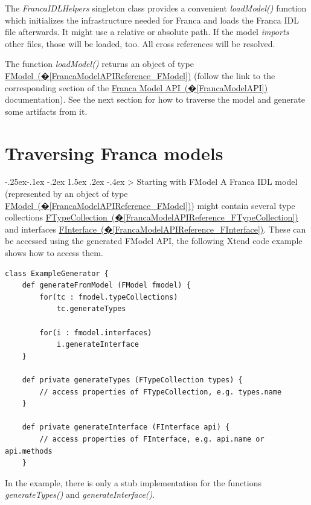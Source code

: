 \documentclass[a4paper,10pt]{scrreprt}
\makeatletter
\renewcommand\subsection{\medskip\@startsection{subsection}{2}{\z@}%
  {-.25ex\@plus -.1ex \@minus -.2ex}%
  {1.5ex \@plus .2ex \@minus -.4ex}%
  {\ifnum \scr@compatibility>\@nameuse{scr@v@2.96}\relax
    \setlength{\parfillskip}{\z@ plus 1fil}\fi
    \raggedsection\normalfont\sectfont\nobreak\size@subsection
  }%
}
\makeatother
\begin{document}
The \textit{FrancaIDLHelpers} singleton class provides a convenient \textit{loadModel()} 
function which initializes the infrastructure needed for Franca and
loads the Franca IDL file afterwards. It might use a relative or absolute
path. If the model \textit{imports} other files, those will be loaded, too.
All cross references will be resolved. 

The function \textit{loadModel()} returns an object of type
\hyperref[FrancaModelAPIReference_FModel]{FModel~(�\ref*{FrancaModelAPIReference_FModel})} (follow the link to the 
corresponding section of the \hyperref[FrancaModelAPI]{Franca Model API~(�\ref*{FrancaModelAPI})} documentation).
See the next section for how to traverse the model and generate some artifacts from it.

\section{Traversing Franca models}
\label{BuildingGenerators_TraversingFrancaModels}
\subsection{Starting with FModel}
\label{BuildingGenerators_TraversingFrancaModels_Top}
A Franca IDL model (represented by an object of type \hyperref[FrancaModelAPIReference_FModel]{FModel~(�\ref*{FrancaModelAPIReference_FModel})}) 
might contain several type collections \hyperref[FrancaModelAPIReference_FTypeCollection]{FTypeCollection~(�\ref*{FrancaModelAPIReference_FTypeCollection})}
and interfaces \hyperref[FrancaModelAPIReference_FInterface]{FInterface~(�\ref*{FrancaModelAPIReference_FInterface})}. These can be accessed using
the generated FModel API, the following Xtend code example shows how to access them.
 

\begin{lstlisting}[language=Xtend]
class ExampleGenerator {
	def generateFromModel (FModel fmodel) {
		for(tc : fmodel.typeCollections)
			tc.generateTypes

		for(i : fmodel.interfaces)
			i.generateInterface
	}
	
	def private generateTypes (FTypeCollection types) {
		// access properties of FTypeCollection, e.g. types.name
	}

	def private generateInterface (FInterface api) {
		// access properties of FInterface, e.g. api.name or api.methods
	}
\end{lstlisting}

In the example, there is only a stub implementation for the functions \textit{generateTypes()}
and \textit{generateInterface()}.  
\end{document}
